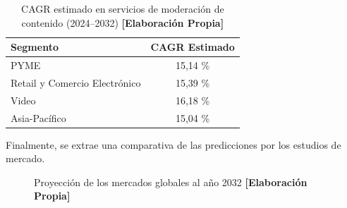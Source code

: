 \begin{table}[h!]
    \centering
    \begin{tabular}{l c}
        \hline
        \textbf{Segmento} & \textbf{CAGR Estimado} \\
        \hline
        PYME & 15,14 \% \\
        Retail y Comercio Electrónico & 15,39 \% \\
        Video & 16,18 \% \\
        Asia-Pacífico & 15,04 \% \\
        \hline
    \end{tabular}
    \caption{CAGR estimado en servicios de moderación de contenido (2024--2032) \textbf{[Elaboración Propia]}}
\end{table}

Finalmente, se extrae una comparativa de las predicciones por los estudios de mercado.


\vspace{0.5cm}

\begin{figure}[h!]
    \centering
    \caption{Proyección de los mercados globales al año 2032 \textbf{[Elaboración Propia]}}
\end{figure}





